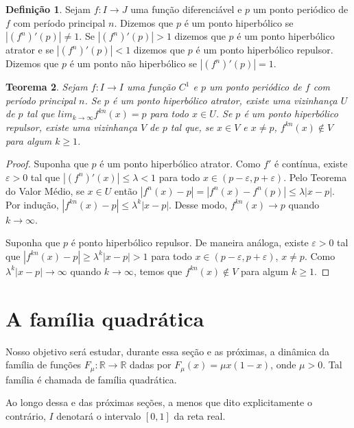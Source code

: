 \documentclass[a4paper, 12pt]{article}
\theoremstyle{definition}
\newtheorem{definition}{Definição}[section]
\theoremstyle{plain}
\theoremstyle{plain}
\theoremstyle{plain}
\newtheorem{theorem}[definition]{Teorema}
\theoremstyle{remark}
\newcommand{\RR}{\mathbb{R}}
\begin{document}
\begin{definition}
Sejam $f: I \rightarrow J$ uma função diferenciável e $p$ um ponto periódico de $f$ com período principal $n$. Dizemos que $p$ é um ponto hiperbólico se $|(f^n)'(p)| \neq 1$. Se $|(f^n)'(p)| > 1$ dizemos que $p$ é um ponto hiperbólico atrator e se $|(f^n)'(p)| < 1$ dizemos que $p$ é um ponto hiperbólico repulsor. Dizemos que $p$ é um ponto não hiperbólico se $|(f^n)'(p)| = 1$.
\end{definition}

\begin{theorem}
Sejam $f: I \rightarrow I$ uma função $C^1$ e $p$ um ponto periódico de $f$ com período principal $n$. Se $p$ é um ponto hiperbólico atrator, existe uma vizinhança $U$ de $p$ tal que $lim_{k \rightarrow \infty} f^{kn}(x) = p$ para todo $x \in U$. Se $p$ é um ponto hiperbólico repulsor, existe uma vizinhança $V$ de $p$ tal que, se $x \in V$ e $x \neq p$, $f^{kn}(x) \notin V$ para algum $k \geq 1$. 
\end{theorem}

\begin{proof}
Suponha que $p$ é um ponto hiperbólico atrator. Como $f'$ é contínua, existe $\varepsilon > 0$ tal que $|(f^n)'(x)| \leq \lambda < 1$ para todo $x \in (p - \varepsilon, p + \varepsilon)$. Pelo Teorema do Valor Médio, se $x \in U$ então $|f^n(x) - p| = |f^n(x) - f^n(p)| \leq \lambda|x - p|$. Por indução, $|f^{kn}(x) - p| \leq \lambda^k|x - p|$. Desse modo, $f^{kn}(x) \rightarrow p$ quando $k \rightarrow \infty$.

Suponha que $p$ é ponto hiperbólico repulsor. De maneira análoga, existe $\varepsilon > 0$ tal que  $|f^{kn}(x) - p| \geq \lambda^k|x - p| > 1$ para todo $x \in (p - \varepsilon, p + \varepsilon)$, $x \neq p$. Como $\lambda^k|x - p| \rightarrow \infty$ quando $k \rightarrow \infty$, temos que  $f^{kn}(x) \notin V$ para algum $k \geq 1$. 
\end{proof}

\section{A família quadrática}

Nosso objetivo será estudar, durante essa seção e as próximas, a dinâmica da família de funções $F_{\mu}: \RR \rightarrow \RR$ dadas por $F_{\mu}(x) = \mu x(1-x)$, onde $\mu > 0$. Tal família é chamada de família quadrática.

Ao longo dessa e das próximas seções, a menos que dito explicitamente o contrário, $I$ denotará o intervalo $[0, 1]$ da reta real.
\end{document}
